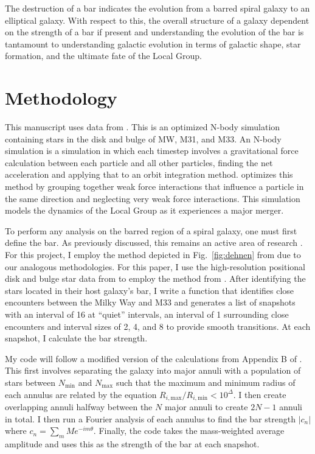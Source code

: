 \documentclass[twocolumn]{aastex631}
\DeclareRobustCommand{\Figref}[1]{Fig.~\ref{#1}}
\begin{document}
The destruction of a bar indicates the evolution from a barred spiral
galaxy to an elliptical galaxy. With respect to this, the overall
structure of a galaxy dependent on the strength of a bar if present
and understanding the evolution of the bar is tantamount to
understanding galactic evolution in terms of galactic shape, star
formation, and the ultimate fate of the Local Group.

\section{Methodology}
  \label{methods}
This manuscript uses data from \citet{vandermarel:12}. This is an
optimized N-body simulation containing stars in the disk and bulge of
MW, M31, and M33. An N-body simulation is a simulation in which each
timestep involves a gravitational force calculation between each
particle and all other particles, finding the net acceleration and
applying that to an orbit integration method. \citet{vandermarel:12}
optimizes this method by grouping together weak force interactions
that influence a particle in the same direction and neglecting very
weak force interactions. This simulation models the dynamics of the
Local Group as it experiences a major merger.

To perform any analysis on the barred region of a spiral galaxy, one
must first define the bar. As previously discussed, this remains an
active area of research \citep{berentzen:03}. For this project, I
employ the method depicted in \Figref{fig:dehnen} from
\citet{dehnen:23} due to our analogous methodologies. For this paper, I use
the high-resolution positional disk and bulge star data from
\citet{vandermarel:12} to employ the method from
\citet{dehnen:23}. After identifying the stars located in their host
galaxy's bar, I write a function that identifies close encounters
between the Milky Way and M33 and generates a list of snapshots with
an interval of 16 at ``quiet'' intervals, an interval of 1 surrounding
close encounters and interval sizes of 2, 4, and 8 to provide smooth
transitions. At each snapshot, I calculate the bar strength.

My code will follow a modified version of the calculations from
Appendix B of \citet{dehnen:23}. This first involves separating the
galaxy into major annuli with a population of stars between
$N_\text{min}$ and $N_\text{max}$ such that the maximum and minimum
radius of each annulus are related by the equation
$R_{i,\text{max}}/R_{i,\text{min}} < 10^\Delta$. I then create
overlapping annuli halfway between the $N$ major annuli to create
$2N-1$ annuli in total. I then run a Fourier analysis of each annulus
to find the bar strength $|c_n|$ where $c_n = \sum_m
Me^{-im\theta}$. Finally, the code takes the mass-weighted average
amplitude and uses this as the strength of the bar at each snapshot.
\end{document}
